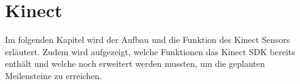 \chapter{Kinect}\label{c:kinect}      %
Im folgenden Kapitel wird der Aufbau und die Funktion des Kinect Sensors erläutert. Zudem
wird aufgezeigt, welche Funktionen das Kinect SDK bereits enthält und welche noch erweitert
werden mussten, um die geplanten Meilensteine zu erreichen.



